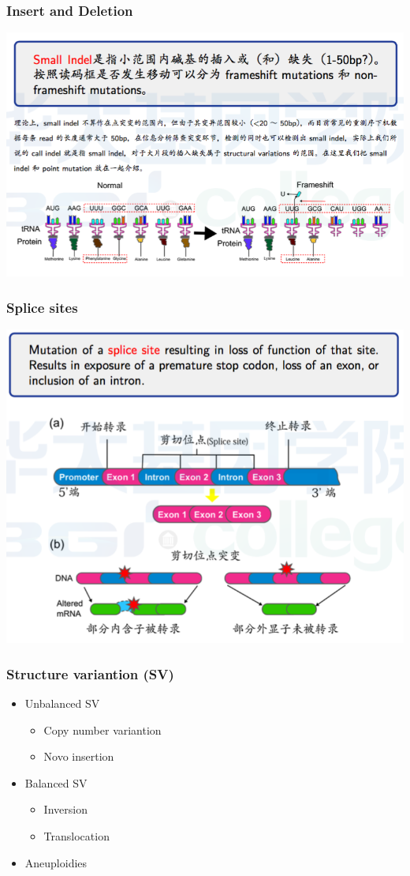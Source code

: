 \documentclass[12pt]{beamer}
\begin{document}
\begin{frame}\frametitle{Insert and Deletion}
  \includegraphics[width=\textwidth]{figures/old_slides/indel.png}
\end{frame}

\begin{frame}\frametitle{Splice sites}
  \includegraphics[width=\textwidth]{figures/old_slides/splice.png}
\end{frame}

\begin{frame}\frametitle{Structure variantion (SV)}
  \begin{itemize}
  \item Unbalanced SV
    \begin{itemize}
    \item Copy number variantion
    \item Novo insertion
    \end{itemize}
  \item Balanced SV
    \begin{itemize}
    \item Inversion
    \item Translocation
    \end{itemize}
  \item Aneuploidies
  \end{itemize}
\end{frame}
\end{document}
